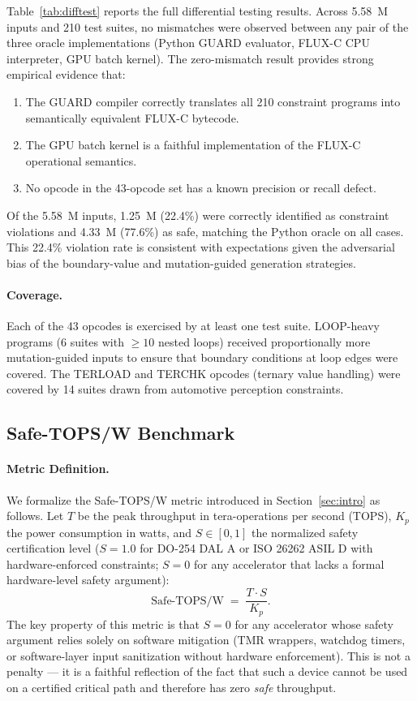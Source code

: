 \documentclass[conference]{IEEEtran}
\begin{document}
Table~\ref{tab:difftest} reports the full differential testing results.
Across 5.58~M inputs and 210 test suites, no mismatches were observed
between any pair of the three oracle implementations (Python GUARD
evaluator, FLUX-C CPU interpreter, GPU batch kernel).
The zero-mismatch result provides strong empirical evidence that:
\begin{enumerate}
  \item The GUARD compiler correctly translates all 210 constraint programs
        into semantically equivalent FLUX-C bytecode.
  \item The GPU batch kernel is a faithful implementation of the FLUX-C
        operational semantics.
  \item No opcode in the 43-opcode set has a known precision or recall defect.
\end{enumerate}
Of the 5.58~M inputs, 1.25~M (22.4\%) were correctly identified as
constraint violations and 4.33~M (77.6\%) as safe, matching the Python
oracle on all cases. This 22.4\% violation rate is consistent with
expectations given the adversarial bias of the boundary-value and
mutation-guided generation strategies.

\paragraph{Coverage.}
Each of the 43 opcodes is exercised by at least one test suite.
LOOP-heavy programs (6 suites with $\ge 10$ nested loops) received
proportionally more mutation-guided inputs to ensure that boundary
conditions at loop edges were covered.
The TERLOAD and TERCHK opcodes (ternary value handling) were covered by
14 suites drawn from automotive perception constraints.

\subsection{Safe-TOPS/W Benchmark}
\label{sec:eval-safetops}

\paragraph{Metric Definition.}
We formalize the Safe-TOPS/W metric introduced in Section~\ref{sec:intro}
as follows. Let $T$ be the peak throughput in tera-operations per second
(TOPS), $K_p$ the power consumption in watts, and $S \in [0, 1]$ the
normalized safety certification level ($S = 1.0$ for DO-254 DAL A or
ISO 26262 ASIL D with hardware-enforced constraints; $S = 0$ for any
accelerator that lacks a formal hardware-level safety argument):
\[
  \text{Safe-TOPS/W} \;=\; \frac{T \cdot S}{K_p}.
\]
The key property of this metric is that $S = 0$ for any accelerator whose
safety argument relies solely on software mitigation (TMR wrappers,
watchdog timers, or software-layer input sanitization without hardware
enforcement). This is not a penalty — it is a faithful reflection of the
fact that such a device cannot be used on a certified critical path and
therefore has zero \emph{safe} throughput.
\end{document}
